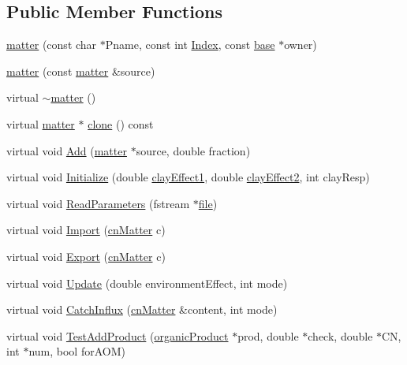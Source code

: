 \subsection*{Public Member Functions}
\begin{DoxyCompactItemize}
\item 
\hyperlink{classmatter_acb99722e3f542cfcdcc658e1276f9027}{matter} (const char $\ast$Pname, const int \hyperlink{classbase_afa59aaa1a0201700640234eb13a03aae}{Index}, const \hyperlink{classbase}{base} $\ast$owner)
\item 
\hyperlink{classmatter_a0b5df9f5426e3b2fc39b3cf1fa220b11}{matter} (const \hyperlink{classmatter}{matter} \&source)
\item 
virtual \hyperlink{classmatter_aa3c8c1d5f9fd9db9dba4afb72acd94a1}{$\sim$matter} ()
\item 
virtual \hyperlink{classmatter}{matter} $\ast$ \hyperlink{classmatter_afca594a86c75c8f40856bc5c8711266c}{clone} () const 
\item 
virtual void \hyperlink{classmatter_a5cda91bc9eb0bfbc1fd1003cf574e39c}{Add} (\hyperlink{classmatter}{matter} $\ast$source, double fraction)
\item 
virtual void \hyperlink{classmatter_adeae5b9c4239d6c02c19e04d346e6d10}{Initialize} (double \hyperlink{classmatter_a1da4af6772cb60316fe1152209eb2835}{clayEffect1}, double \hyperlink{classmatter_a79e544386cdb596986c6bf1396a6d79b}{clayEffect2}, int clayResp)
\item 
virtual void \hyperlink{classmatter_a8418c63bc2206df9cb0de19aa195eeac}{ReadParameters} (fstream $\ast$\hyperlink{classbase_a3af52ee9891719d09b8b19b42450b6f6}{file})
\item 
virtual void \hyperlink{classmatter_a284c87f3ce437b9e71f32ec14d9fab64}{Import} (\hyperlink{classcn_matter}{cnMatter} c)
\item 
virtual void \hyperlink{classmatter_a3fe12afab8b3df24433e64de80f81e81}{Export} (\hyperlink{classcn_matter}{cnMatter} c)
\item 
virtual void \hyperlink{classmatter_a2b3dd492a18a139790bd227e2b4e0a70}{Update} (double environmentEffect, int mode)
\item 
virtual void \hyperlink{classmatter_a5ad9b7b66c194958cdf58ec47024c0c9}{CatchInflux} (\hyperlink{classcn_matter}{cnMatter} \&content, int mode)
\item 
virtual void \hyperlink{classmatter_ac17664d421545b45ef91061b17ae6c7b}{TestAddProduct} (\hyperlink{classorganic_product}{organicProduct} $\ast$prod, double $\ast$check, double $\ast$CN, int $\ast$num, bool forAOM)

\end{DoxyCompactItemize}
